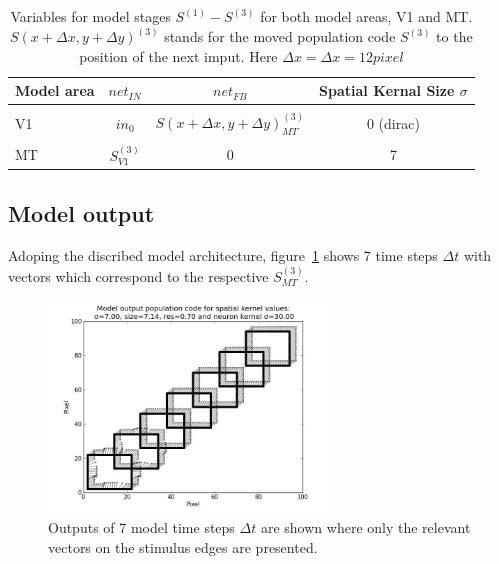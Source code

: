 \documentclass[a4paper]{article}
\begin{document}
\begin{table}[ht]
\centering
\begin{tabular}{l|c c c}
	Model area & $net_{IN}$ & $net_{FB}$ & Spatial Kernal Size $\sigma$\\ \hline \hline\\
	V1 		  & $in_{0}$ & $S(x+\Delta x,y+\Delta y)^{(3)}_{MT}$ & 0 (dirac) \\ \\
	MT 		  & $S^{(3)}_{V1}$ & 0 & 7\\
\end{tabular}
\caption{Variables for model stages $S^{(1)}-S^{(3)}$ for both model areas, V1 and MT. $S(x+\Delta x, y+\Delta y)^{(3)}$ stands for the moved population code $S^{(3)}$ to the position of the next imput. Here $\Delta x= \Delta x =12 pixel$}
\label{tab:variables}
\end{table}

\subsection{Model output}
Adoping the discribed model architecture, figure~\ref{fig:output} shows 7 time steps $\Delta t$ with vectors which correspond to the respective $S^{(3)}_{MT}$.

\vspace{0.5cm}
\begin{figure}[ht]
\centering
\includegraphics[width=7.5cm]{pics/output}
\caption{Outputs of 7 model time steps $\Delta t$ are shown where only the relevant vectors on the stimulus edges are presented.}
\label{fig:output}
\end{figure}
\vspace{0.5cm}
\end{document}
